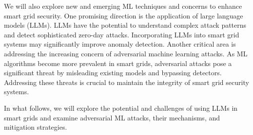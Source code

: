 \documentclass[10pt, journal]{IEEEtran}
\begin{document}
We will also explore new and emerging ML techniques and concerns to enhance smart grid security. One promising direction is the application of large language models (LLMs). LLMs have the potential to understand complex attack patterns and detect sophisticated zero-day attacks. Incorporating LLMs into smart grid systems may significantly improve anomaly detection. Another critical area is addressing the increasing concern of adversarial machine learning attacks. As ML algorithms become more prevalent in smart grids, adversarial attacks pose a significant threat by misleading existing models and bypassing detectors. Addressing these threats is crucial to maintain the integrity of smart grid security systems.

In what follows, we will explore the potential and challenges of using LLMs in smart grids and examine adversarial ML attacks, their mechanisms, and mitigation strategies.



\end{document}
